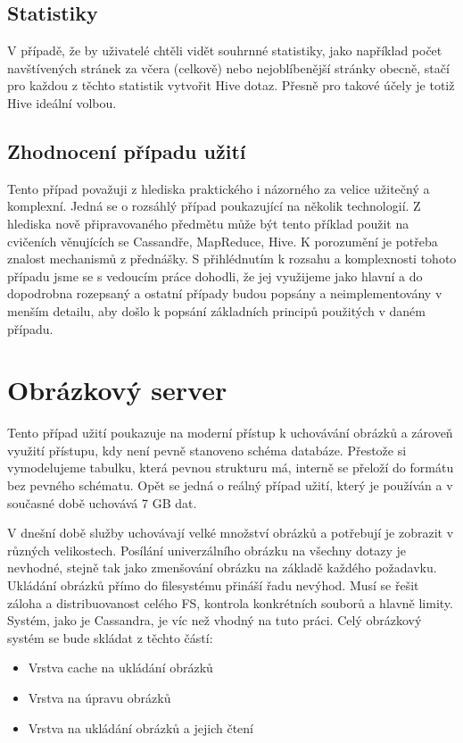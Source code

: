\subsection{Statistiky}
V případě, že by uživatelé chtěli vidět souhrnné statistiky, jako například počet navštívených stránek za včera (celkově) nebo nejoblíbenější stránky obecně, stačí pro každou z těchto statistik vytvořit Hive dotaz. Přesně pro takové účely je totiž Hive ideální volbou.

\subsection{Zhodnocení případu užití}
Tento případ považuji z hlediska praktického i názorného za velice užitečný a komplexní. Jedná se o rozsáhlý případ poukazující na několik technologií. Z hlediska nově připravovaného předmětu může být tento příklad použit na cvičeních věnujících se Cassandře, MapReduce, Hive. K porozumění je potřeba znalost mechanismů z přednášky. S přihlédnutím k rozsahu a komplexnosti tohoto případu jsme se s vedoucím práce dohodli, že jej využijeme jako hlavní a do dopodrobna rozepsaný a ostatní případy budou popsány a neimplementovány v menším detailu, aby došlo k popsání základních principů použitých v daném případu. 


\section{Obrázkový server}
Tento případ užití poukazuje na moderní přístup k uchovávání obrázků a zároveň využití přístupu, kdy není pevně stanoveno schéma databáze. Přestože si vymodelujeme tabulku, která pevnou strukturu má, interně se přeloží do formátu bez pevného schématu. Opět se jedná o reálný případ užití, který je používán a v současné době uchovává 7 GB dat. 

V dnešní době služby uchovávají velké množství obrázků a potřebují je zobrazit v různých velikostech. Posílání univerzálního obrázku na všechny dotazy je nevhodné, stejně tak jako zmenšování obrázku na základě každého požadavku. Ukládání obrázků přímo do filesystému přináší řadu nevýhod. Musí se řešit záloha a distribuovanost celého FS, kontrola konkrétních souborů a hlavně limity. Systém, jako je Cassandra, je víc než vhodný na tuto práci. Celý obrázkový systém se bude skládat z těchto částí:

\begin{itemize}
\item Vrstva cache na ukládání obrázků
\item Vrstva na úpravu obrázků 
\item Vrstva na ukládání obrázků a jejich čtení
\end{itemize} 


